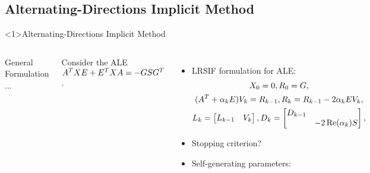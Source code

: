 \subsection{Alternating-Directions Implicit Method}

\begin{frame}<1>{Alternating-Directions Implicit Method}
\begin{columns}
  \begin{block}{General Formulation \parencite{Peaceman1955}}
    ...
  \end{block}
  Consider the ALE $A^T X E + E^T X A = - GSG^T$.
  \begin{itemize}
    \item
      LRSIF formulation for ALE: \cite{Lang2017}
      \begin{gather*}
        X_0 = 0, R_0 = G,\\
        (A^T + \alpha_k E) V_k = R_{k-1},
        R_k = R_{k-1} - 2\alpha_k E V_k,\\
        L_k = \begin{bmatrix} L_{k-1} & V_k \end{bmatrix},
        D_k = \begin{bmatrix} D_{k-1} \\ & -2\operatorname{Re}(\alpha_k) S \end{bmatrix},\\
      \end{gather*}
    \item
      Stopping criterion?
    \item
      Self-generating parameters: \cite{Kuerschner2016}
  \end{itemize}
\end{columns}
\end{frame}

